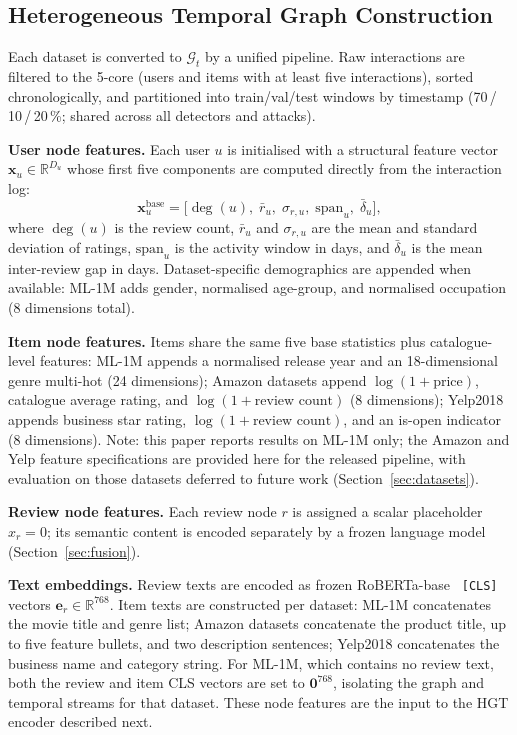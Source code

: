\subsection{Heterogeneous Temporal Graph Construction}
\label{sec:graph_construction}

Each dataset is converted to $\mathcal{G}_t$ by a unified pipeline.
Raw interactions are filtered to the 5-core (users and items with at least five
interactions), sorted chronologically, and partitioned into train/val/test
windows by timestamp (70\,/\,10\,/\,20\,\%; shared across all detectors and
attacks).

\textbf{User node features.}
Each user $u$ is initialised with a structural feature vector
$\mathbf{x}_u \in \mathbb{R}^{D_u}$ whose first five components are computed
directly from the interaction log:
\[
  \mathbf{x}_u^{\text{base}} =
  \bigl[\deg(u),\; \bar{r}_u,\; \sigma_{r,u},\; \text{span}_u,\; \bar{\delta}_u\bigr],
\]
where $\deg(u)$ is the review count, $\bar{r}_u$ and $\sigma_{r,u}$ are the
mean and standard deviation of ratings, $\text{span}_u$ is the activity window
in days, and $\bar{\delta}_u$ is the mean inter-review gap in days.
Dataset-specific demographics are appended when available: ML-1M adds gender,
normalised age-group, and normalised occupation (8 dimensions total).

\textbf{Item node features.}
Items share the same five base statistics plus catalogue-level features:
ML-1M appends a normalised release year and an 18-dimensional genre multi-hot
(24 dimensions); Amazon datasets append $\log(1{+}\text{price})$, catalogue
average rating, and $\log(1{+}\text{review count})$ (8 dimensions); Yelp2018
appends business star rating, $\log(1{+}\text{review count})$, and an
is-open indicator (8 dimensions).
Note: this paper reports results on ML-1M only; the Amazon and Yelp
feature specifications are provided here for the released pipeline, with
evaluation on those datasets deferred to future work
(Section~\ref{sec:datasets}).

\textbf{Review node features.}
Each review node $r$ is assigned a scalar placeholder $x_r = 0$; its semantic
content is encoded separately by a frozen language model
(Section~\ref{sec:fusion}).

\textbf{Text embeddings.}
Review texts are encoded as frozen RoBERTa-base~\cite{liu2019roberta}
\texttt{[CLS]} vectors $\mathbf{e}_r \in \mathbb{R}^{768}$.
Item texts are constructed per dataset: ML-1M concatenates the movie title and
genre list; Amazon datasets concatenate the product title, up to five feature
bullets, and two description sentences; Yelp2018 concatenates the business name
and category string.
For ML-1M, which contains no review text, both the review and item CLS vectors
are set to $\mathbf{0}^{768}$, isolating the graph and temporal streams for
that dataset.
These node features are the input to the HGT encoder described next.

